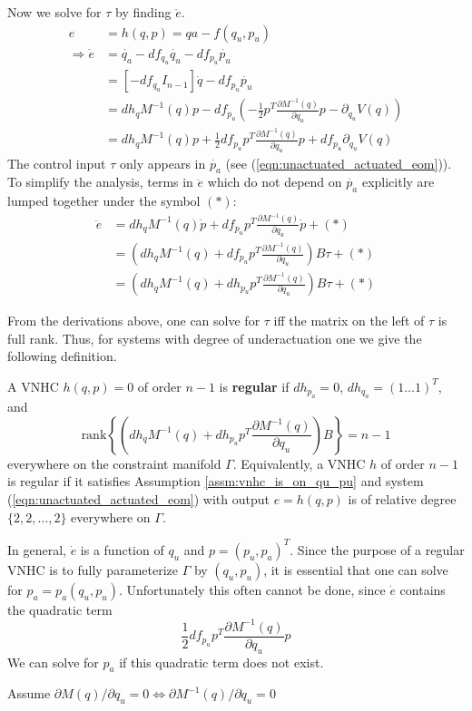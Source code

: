 Now we solve for \(\tau\) by finding \(\ddot{e}\).
\begin{align*}
    e &= h(q,p) = qa - f(q_u,p_u)\\
    \Rightarrow \dot{e} &= \dot{q_a} - df_{q_u}\dot{q_u} -df_{p_u}\dot{p_u} \\
    &= [-df_{q_u} I_{n-1}]\dot{q} - df_{p_u} \dot{p_u} \\
    &= dh_q M^{-1}(q) p - df_{p_u}\left( -\frac{1}{2}p^T \frac{\partial M^{-1}(q)}{\partial q_u} p - \partial_{q_u}V(q) \right) \\
    &= dh_q M^{-1}(q) p + \frac{1}{2}df_{p_u} p^T \frac{\partial M^{-1}(q)}{\partial q_u} p + df_{p_u}\partial_{q_u}V(q)
\end{align*}
The control input \(\tau\) only appears in \(\dot{p_a}\) (see (\ref{eqn:unactuated_actuated_eom})). To simplify the analysis, terms in \(\ddot{e}\) which do not depend on \(\dot{p_a}\) explicitly are lumped together under the symbol \((*)\):
\begin{align*}
    \ddot{e} &= dh_q M^{-1}(q) \dot{p} + df_{p_u} p^T \frac{\partial M^{-1}(q)}{\partial q_u} \dot{p} + (*) \\
    &= (dh_q M^{-1}(q) + df_{p_u} p^T \frac{\partial M^{-1}(q)}{\partial q_u})B\tau + (*) \\
    &= (dh_q M^{-1}(q) + dh_{p_u} p^T \frac{\partial M^{-1}(q)}{\partial q_u})B\tau + (*)
\end{align*}

From the derivations above, one can solve for \(\tau\) iff the matrix on the left of \(\tau\) is full rank. Thus, for systems with degree of underactuation one we give the following definition.
\begin{defn}
A VNHC \(h(q,p) = 0\) of order \(n - 1\) is \textbf{regular} if \(dh_{p_a} = 0\), \(dh_{q_a} = (1 \ldots 1)^T\), and 
\[
\text{rank}\left\{ (dh_q M^{-1}(q) + dh_{p_u} p^T \frac{\partial M^{-1}(q)}{\partial q_u})B\right\} = n - 1
\]
everywhere on the constraint manifold \(\Gamma\). Equivalently, a VNHC \(h\) of order \(n - 1\) is regular if it satisfies Assumption \ref{assm:vnhc_is_on_qu_pu} and system (\ref{eqn:unactuated_actuated_eom}) with output \(e = h(q,p)\) is of relative degree \(\{2,2,\ldots,2\}\) everywhere on \(\Gamma\).
\end{defn}

In general, \(\dot{e}\) is a function of \(q_u\) and \(p = (p_u,p_a)^T\). Since the purpose of a regular VNHC is to fully parameterize \(\Gamma\) by \((q_u,p_u)\), it is essential that one can solve for \(p_a = p_a(q_u,p_u)\). Unfortunately this often cannot be done, since \(\dot{e}\) contains the quadratic term
\[
\frac{1}{2} df_{p_u} p^T \frac{\partial M^{-1}(q)}{\partial q_u} p 
\]
We can solve for \(p_a\) if this quadratic term does not exist.
\begin{assm}\label{assm:M_is_Mqa}
Assume \(\partial M(q) / \partial q_u = 0 \Leftrightarrow \partial M^{-1}(q) / \partial q_u = 0\)
\end{assm}

